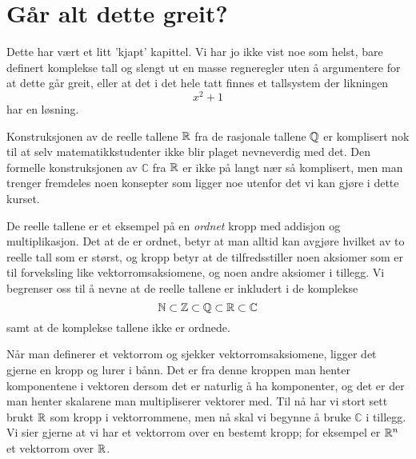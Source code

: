 \section*{Går alt dette greit?}
Dette har vært et litt 'kjapt' kapittel. Vi har jo ikke vist noe som helst, bare definert komplekse tall og slengt ut en masse regneregler uten å argumentere for at dette går greit, eller at det i det hele tatt finnes et tallsystem der likningen
\[
x^2+1
\]
har en løsning. 

Konstruksjonen av de reelle tallene $\mathbb{R}$ fra de rasjonale tallene $\mathbb{Q}$ er komplisert nok til at selv matematikkstudenter ikke blir plaget nevneverdig med det. Den formelle konstruksjonen av $\mathbb C$ fra $\mathbb{R}$ er ikke på langt nær så komplisert, men man trenger fremdeles noen konsepter som ligger noe utenfor det vi kan gjøre i dette kurset.

De reelle tallene er et eksempel på en \emph{ordnet} kropp med addisjon og multiplikasjon. Det at de er ordnet, betyr at man alltid kan avgjøre hvilket av to reelle tall som er størst, og kropp betyr at de tilfredsstiller noen aksiomer som er til forveksling like vektorromsaksiomene, og noen andre aksiomer i tillegg. Vi begrenser oss til å nevne at de reelle tallene er inkludert i de komplekse 
\[
\mathbb{N} \subset \mathbb{Z} \subset \mathbb{Q} \subset \mathbb{R} \subset \mathbb C
\]
samt at de komplekse tallene ikke er ordnede.

Når man definerer et vektorrom og sjekker vektorromsaksiomene, ligger det gjerne en kropp og lurer i bånn. Det er fra denne kroppen man henter komponentene i vektoren dersom det er naturlig å ha komponenter, og det er der man henter skalarene man multipliserer vektorer med. Til nå har vi stort sett brukt $\mathbb{R}$ som kropp i vektorrommene, men nå skal vi begynne å bruke $\mathbb C$ i tillegg. Vi sier gjerne at vi har et vektorrom over en bestemt kropp; for eksempel er $\mathbb{R}^n$ et vektorrom over $\mathbb{R}$.

\kapittelslutt
